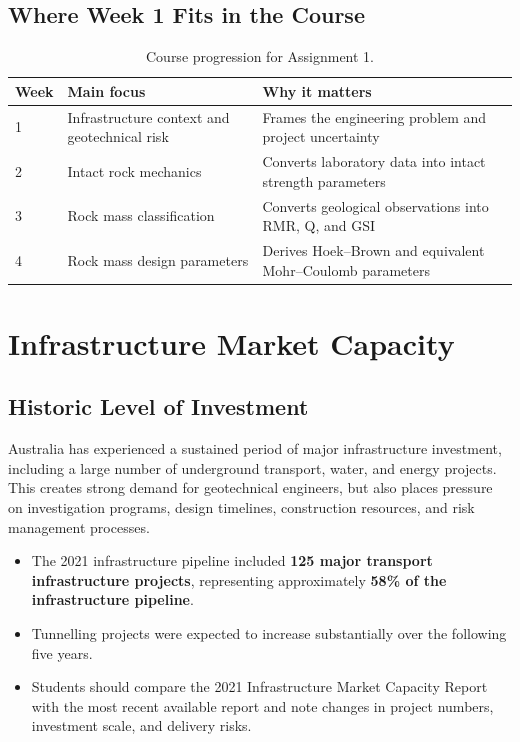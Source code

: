 \documentclass[a4paper,12pt]{article}
\begin{document}
\subsection{Where Week 1 Fits in the Course}

\begin{table}[H]
\centering
\small
\begin{tabularx}{\textwidth}{l X X}
\toprule
\textbf{Week} & \textbf{Main focus} & \textbf{Why it matters} \\
\midrule
1 & Infrastructure context and geotechnical risk & Frames the engineering problem and project uncertainty \\
2 & Intact rock mechanics & Converts laboratory data into intact strength parameters \\
3 & Rock mass classification & Converts geological observations into RMR, Q, and GSI \\
4 & Rock mass design parameters & Derives Hoek--Brown and equivalent Mohr--Coulomb parameters \\
\bottomrule
\end{tabularx}
\caption{Course progression for Assignment 1.}
\end{table}

\section{Infrastructure Market Capacity}

\subsection{Historic Level of Investment}
Australia has experienced a sustained period of major infrastructure investment, including a large number of underground transport, water, and energy projects. This creates strong demand for geotechnical engineers, but also places pressure on investigation programs, design timelines, construction resources, and risk management processes.

\begin{itemize}
    \item The 2021 infrastructure pipeline included \textbf{125 major transport infrastructure projects}, representing approximately \textbf{58\% of the infrastructure pipeline}.
    \item Tunnelling projects were expected to increase substantially over the following five years.
    \item Students should compare the 2021 Infrastructure Market Capacity Report with the most recent available report and note changes in project numbers, investment scale, and delivery risks.
\end{itemize}
\end{document}
